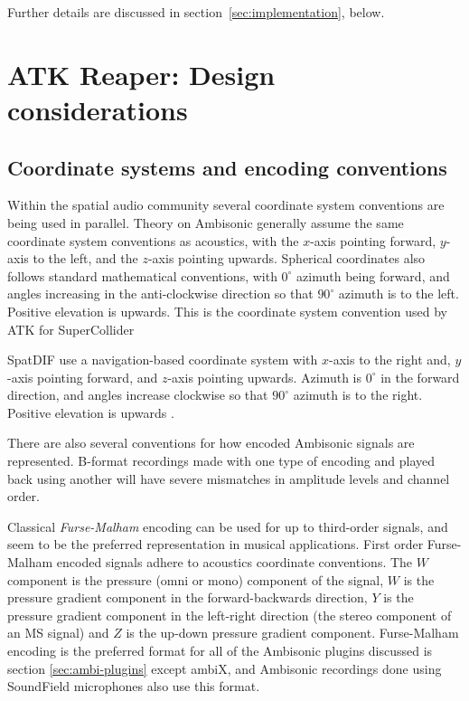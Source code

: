 \documentclass{article}
\begin{document}
Further details are discussed in section~\ref{sec:implementation}, below.


\section{ATK Reaper: Design considerations}\label{sec:design}

\subsection{Coordinate systems and encoding conventions}\label{sec:coordinate-systems}

Within the spatial audio community several coordinate system conventions are being used in parallel.
Theory on Ambisonic generally assume the same coordinate system conventions as acoustics, with the $x$-axis pointing forward, $y$-axis to the left, and the $z$-axis pointing upwards. 
Spherical coordinates also follows standard mathematical conventions, with $0^{\circ}$ azimuth being forward, and angles increasing in the anti-clockwise direction so that $90^{\circ}$ azimuth is to the left.
Positive elevation is upwards.
This is the coordinate system convention used by ATK for SuperCollider

SpatDIF use a navigation-based coordinate system with $x$-axis to the right and, $y$-axis pointing forward, and $z$-axis pointing upwards.
Azimuth is $0^{\circ}$ in the forward direction, and angles increase clockwise so that $90^{\circ}$ azimuth is to the right.
Positive elevation is upwards \cite{Peters:2013spatdif}.

There are also several conventions for how encoded Ambisonic signals are represented.
B-format recordings made with one type of encoding and played back using another will have severe mismatches in amplitude levels and channel order.

Classical \emph{Furse-Malham} encoding can be used for up to third-order signals, and seem to be the preferred representation in musical applications.
First order Furse-Malham encoded signals adhere to acoustics coordinate conventions.
The $W$ component is the pressure (omni or mono) component of the signal, $W$ is the pressure gradient component in the forward-backwards direction, $Y$ is the pressure gradient component in the left-right direction (the stereo component of an MS signal) and $Z$ is the up-down pressure gradient component.
Furse-Malham encoding is the preferred format for all of the Ambisonic plugins discussed is section \ref{sec:ambi-plugins} except ambiX, and Ambisonic recordings done using SoundField microphones also use this format.
\end{document}
